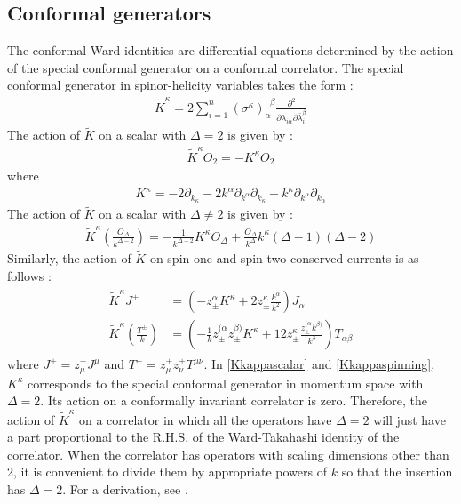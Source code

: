 \documentclass[a4paper,11pt]{article}
\begin{document}
\subsection{Conformal generators}
\label{SectionCG}
The conformal Ward identities are differential equations determined by the action of the special conformal generator on a conformal correlator. The special conformal generator in spinor-helicity variables takes the form  \cite{Witten:2003nn} :
%
\begin{align}
\widetilde{K}^{\kappa}=2\sum_{i=1}^n\left(\sigma^{\kappa}\right)_{\alpha}^{\;\; \beta}\frac{\partial^2}{\partial \lambda _{i\alpha}\partial \bar{\lambda}_i^{\beta}}
\end{align}
%
The action of $\widetilde{K}$ on a scalar with $\Delta=2$ is given by \cite{Baumann:2020dch} :
\begin{align}
\widetilde{K}^{\kappa}O_2 = -K^{\kappa}O_2
\end{align}
where 
\begin{align}\label{Kkappascalar}
K^{\kappa}=-2 \partial_{k_{\kappa}}-2 k^{\alpha} \partial_{k^{\alpha}} \partial_{k_{\kappa}}+k^{\kappa} \partial_{k^{\alpha}} \partial_{k_{\alpha}}
\end{align}
The action of $\widetilde{K}$ on a scalar with $\Delta\ne 2$ is given by \cite{Baumann:2020dch} :
\begin{align}
\label{Kkappageneralscalar}
\widetilde{K}^{\kappa}\left(\frac{O_{\Delta}}{k^{\Delta-2}}\right)= -\frac{1}{k^{\Delta-2}}K^{\kappa}O_{\Delta}+\frac{O_{\Delta}}{k^{\Delta}}k^{\kappa}(\Delta-1)(\Delta-2)
\end{align}
Similarly, the action of $\widetilde{K}$  on spin-one and spin-two conserved currents is as follows \cite{Baumann:2020dch} :
\begin{align}\label{Kkappaspinning}
\begin{aligned}
\widetilde{K}^{\kappa} J^{\pm} &=\left(-z_{\pm}^{\alpha} K^{\kappa}+2 z_{\pm}^{\kappa} \frac{k^{\alpha}}{k^{2}}\right) J_{\alpha} \\
\widetilde{K}^{\kappa}\left(\frac{T^{\pm}}{k}\right) &=\left(-\frac{1}{k} z_{\pm}^{(\alpha} z_{\pm}^{\beta)} K^{\kappa}+12 z_{\pm}^{\kappa} \frac{z_{\pm}^{(\alpha} k^{\beta)}}{k^{3}}\right) T_{\alpha \beta}
\end{aligned}
\end{align}
where  $J^+=z^{+}_{\mu}J^\mu$ and  $T^+=z^{+}_{\mu}z^{+}_{\nu}T^{\mu\nu}$.
In \eqref{Kkappascalar} and \eqref{Kkappaspinning}, $K^{\kappa}$ corresponds to the special conformal generator in momentum space with $\Delta=2$. Its action on a conformally invariant correlator is zero. Therefore, the action of $\widetilde{K}^{\kappa}$ on a correlator in which all the operators have $\Delta=2$ will just have a part proportional to the R.H.S. of the Ward-Takahashi identity of the correlator. When the correlator has operators with scaling dimensions other than 2, it is convenient to divide them by appropriate powers of $k$ so that the insertion has $\Delta=2$. For a derivation,  see \cite{Mata:2012bx}.
\end{document}
